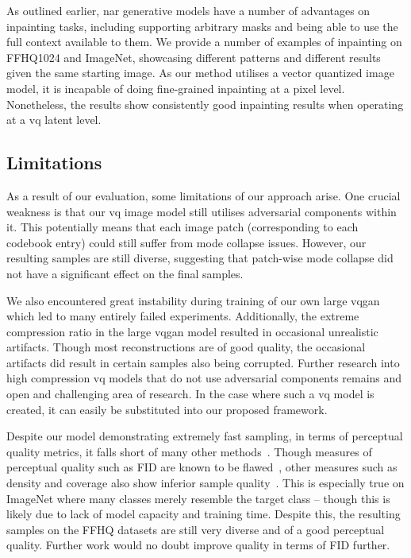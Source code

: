 As outlined earlier, \acrlong{nar} generative models have a number of advantages
on inpainting tasks, including supporting arbitrary masks and being able to use
the full context available to them. We provide a number of examples of
inpainting on FFHQ1024 and ImageNet, showcasing different patterns and different
results given the same starting image. As our method utilises a vector quantized
image model, it is incapable of doing fine-grained inpainting at a pixel level.
Nonetheless, the results show consistently good inpainting results when
operating at a \gls{vq} latent level.

\subsection{Limitations}
\label{subsec:evaluationLimitation}

As a result of our evaluation, some limitations of our approach arise. One
crucial weakness is that our \gls{vq} image model still utilises adversarial
components within it. This potentially means that each image patch
(corresponding to each codebook entry) could still suffer from mode collapse
issues. However, our resulting samples are still diverse, suggesting that
patch-wise mode collapse did not have a significant effect on the final samples.

We also encountered great instability during training of our own large
\gls{vqgan} which led to many entirely failed experiments. Additionally, the
extreme compression ratio in the large \gls{vqgan} model resulted in occasional
unrealistic artifacts. Though most reconstructions are of good quality, the
occasional artifacts did result in certain samples also being corrupted. Further
research into high compression \gls{vq} models that do not use adversarial
components remains and open and challenging area of research. In the case where
such a \gls{vq} model is created, it can easily be substituted into our proposed
framework.

Despite our model demonstrating extremely fast sampling, in terms of perceptual
quality metrics, it falls short of many other
methods~\cite{bondtaylor2021unleashing}. Though measures of perceptual quality
such as FID are known to be flawed~\cite{chong2020effectively}, other measures
such as density and coverage also show inferior sample
quality~\cite{ferjad2020icml}. This is especially true on ImageNet where many
classes merely resemble the target class -- though this is likely due to lack of
model capacity and training time. Despite this, the resulting samples on the
FFHQ datasets are still very diverse and of a good perceptual quality. Further
work would no doubt improve quality in terms of FID further.
